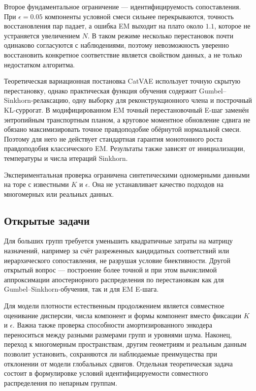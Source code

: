 Второе фундаментальное ограничение --- идентифицируемость сопоставления. При
$\epsilon=0.05$ компоненты условной смеси сильнее перекрываются, точность восстановления пар
падает, а ошибка EM выходит на плато около $1.1$, которое не устраняется увеличением $N$.
В таком режиме несколько перестановок почти одинаково согласуются с наблюдениями, поэтому
невозможность уверенно восстановить конкретное соответствие является свойством данных, а
не только недостатком алгоритма.

Теоретическая вариационная постановка CatVAE использует точную скрытую перестановку, однако
практическая функция обучения содержит Gumbel--Sinkhorn-релаксацию, одну выборку для
реконструкционного члена и построчный KL-суррогат. В модифицированном EM точный
перестановочный E-шаг заменён энтропийным транспортным планом, а круговое моментное
обновление сдвига не обязано максимизировать точное правдоподобие обёрнутой нормальной
смеси. Поэтому для него не действует стандартная гарантия монотонного роста
правдоподобия классического EM. Результаты также зависят от инициализации, температуры и
числа итераций Sinkhorn.

Экспериментальная проверка ограничена синтетическими одномерными данными на торе с
известными $K$ и $\epsilon$. Она не устанавливает качество подходов на многомерных или
реальных данных.

\subsection{Открытые задачи}

Для больших групп требуется уменьшить квадратичные затраты на матрицу назначений, например
за счёт разреженных кандидатных соответствий или иерархического сопоставления, не разрушая
условие биективности. Другой открытый вопрос --- построение более точной и при этом
вычислимой аппроксимации апостериорного распределения по перестановкам как для
Gumbel--Sinkhorn-обучения, так и для EM E-шага.

Для модели плотности естественным продолжением является совместное оценивание дисперсии,
числа компонент и формы компонент вместо фиксации $K$ и $\epsilon$. Важна также проверка
способности амортизированного энкодера переноситься между разными размерами групп и уровнями
шума. Наконец, переход к многомерным пространствам, другим геометриям и реальным данным
позволит установить, сохраняются ли наблюдаемые преимущества при отклонении от модели
глобальных сдвигов. Отдельная теоретическая задача состоит в формулировке условий
идентифицируемости совместного распределения по непарным группам.

